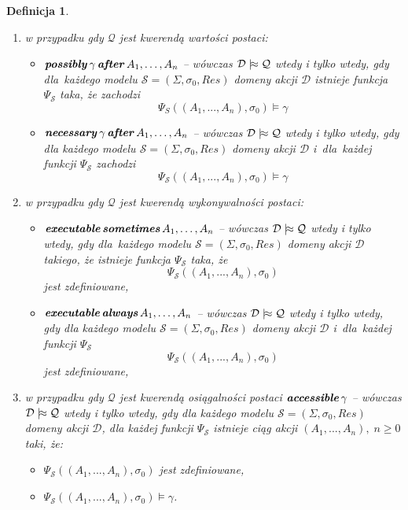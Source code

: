 \documentclass[11pt,a4paper]{article}
\newtheorem{defn}{Definicja}
\DeclareMathOperator{\After}{\textbf{\textit{after}}}
\DeclareMathOperator{\Always}{\textbf{\textit{always}}}
\DeclareMathOperator{\Sometimes}{\textbf{\textit{sometimes}}}
\DeclareMathOperator{\Executable}{\textbf{\textit{executable}}}
\DeclareMathOperator{\Accessible}{\textbf{\textit{accessible}}}
\DeclareMathOperator{\Possibly}{\textbf{\textit{possibly}}}
\DeclareMathOperator{\Necessary}{\textbf{\textit{necessary}}}
\def\consequence{\mathrel|\joinrel\approx}
\begin{document}
\begin{defn}
    \begin{enumerate}
        \item w przypadku gdy $\mathcal{Q}$ jest kwerendą wartości postaci:
        \begin{itemize}
            \item $\Possibly \gamma \After A_1, \dots, A_n$ -- wówczas $\mathcal{D} \consequence \mathcal{Q}$ wtedy i tylko wtedy, gdy dla~każdego modelu %
            $\mathcal{S} = (\Sigma,\sigma_0,Res)$ domeny akcji $\mathcal{D}$ istnieje funkcja $\Psi_\mathcal{S}$ taka, że zachodzi $$\Psi_S((A_1,...,A_n),\sigma_{0}) \models \gamma$$
            \item $\Necessary \gamma \After A_1, \dots, A_n$ -- wówczas $\mathcal{D} \consequence \mathcal{Q}$ wtedy i tylko wtedy, gdy dla każdego modelu %
            $\mathcal{S} = (\Sigma,\sigma_0,Res)$ domeny akcji $\mathcal{D}$ i~dla~każdej funkcji $\Psi_\mathcal{S}$ zachodzi $$\Psi_\mathcal{S}((A_1,...,A_n),\sigma_{0}) \models \gamma$$
        \end{itemize}
        \item w przypadku gdy $\mathcal{Q}$ jest kwerendą wykonywalności postaci:
        \begin{itemize}
            \item $\Executable \Sometimes A_1, \dots, A_n$ -- wówczas $\mathcal{D} \consequence \mathcal{Q}$ wtedy i tylko wtedy, gdy dla~każdego modelu %
            $\mathcal{S} = (\Sigma,\sigma_0,Res)$ domeny akcji $\mathcal{D}$ takiego, że istnieje %
            funkcja $\Psi_\mathcal{S}$ taka, że
            $$\Psi_\mathcal{S}((A_1,...,A_n),\sigma_{0})$$
            jest zdefiniowane,
            \item $\Executable \Always A_1, \dots, A_n$ -- wówczas $\mathcal{D} \consequence \mathcal{Q}$ wtedy i tylko wtedy, gdy dla każdego modelu %
            $\mathcal{S} = (\Sigma,\sigma_0,Res)$ domeny akcji $\mathcal{D}$ i~dla~każdej funkcji $\Psi_\mathcal{S}$
            $$\Psi_\mathcal{S}((A_1,...,A_n),\sigma_{0})$$
            jest zdefiniowane,
        \end{itemize}
        \item w przypadku gdy $\mathcal{Q}$ jest kwerendą osiągalności postaci $\Accessible \gamma$ -- wówczas $\mathcal{D} \consequence \mathcal{Q}$ wtedy i tylko wtedy, gdy dla każdego modelu $\mathcal{S} = (\Sigma,\sigma_0,Res)$ domeny akcji $\mathcal{D}$, dla każdej funkcji $\Psi_\mathcal{S}$ istnieje ciąg akcji $(A_1,...,A_n), \; n \geq 0$ taki, że:
        \begin{itemize}
            \item $\Psi_\mathcal{S}((A_1,...,A_n),\sigma_{0})$ jest zdefiniowane,
            \item $\Psi_\mathcal{S}((A_1,...,A_n),\sigma_{0}) \models \gamma$.
        \end{itemize}
    \end{enumerate}
\end{defn}
\end{document}
